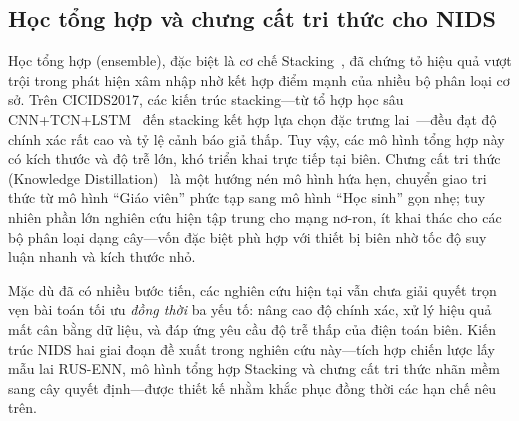 \subsection{Học tổng hợp và chưng cất tri thức cho NIDS}
Học tổng hợp (ensemble), đặc biệt là cơ chế Stacking~\cite{wolpert1992stacked}, đã chứng tỏ hiệu quả vượt trội trong phát hiện xâm nhập nhờ kết hợp điểm mạnh của nhiều bộ phân loại cơ sở. Trên CICIDS2017, các kiến trúc stacking---từ tổ hợp học sâu CNN+TCN+LSTM~\cite{amara2025stacked} đến stacking kết hợp lựa chọn đặc trưng lai~\cite{huang2025stacking, jouybari2025stacking}---đều đạt độ chính xác rất cao và tỷ lệ cảnh báo giả thấp. Tuy vậy, các mô hình tổng hợp này có kích thước và độ trễ lớn, khó triển khai trực tiếp tại biên. Chưng cất tri thức (Knowledge Distillation)~\cite{hinton2015distilling} là một hướng nén mô hình hứa hẹn, chuyển giao tri thức từ mô hình ``Giáo viên'' phức tạp sang mô hình ``Học sinh'' gọn nhẹ; tuy nhiên phần lớn nghiên cứu hiện tập trung cho mạng nơ-ron, ít khai thác cho các bộ phân loại dạng cây---vốn đặc biệt phù hợp với thiết bị biên nhờ tốc độ suy luận nhanh và kích thước nhỏ.

Mặc dù đã có nhiều bước tiến, các nghiên cứu hiện tại vẫn chưa giải quyết trọn vẹn bài toán tối ưu \emph{đồng thời} ba yếu tố: nâng cao độ chính xác, xử lý hiệu quả mất cân bằng dữ liệu, và đáp ứng yêu cầu độ trễ thấp của điện toán biên. Kiến trúc NIDS hai giai đoạn đề xuất trong nghiên cứu này---tích hợp chiến lược lấy mẫu lai RUS-ENN, mô hình tổng hợp Stacking và chưng cất tri thức nhãn mềm sang cây quyết định---được thiết kế nhằm khắc phục đồng thời các hạn chế nêu trên.
